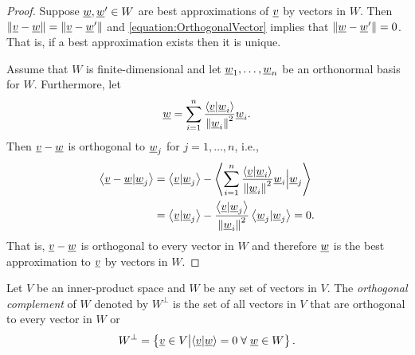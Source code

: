 \begin{proof}
Suppose $\underline{w}, \underline{w}' \in W$ are best approximations of $\underline{v}$ by vectors in $W$.
Then $\left\| \underline{v} - \underline{w} \right\| = \left\| \underline{v} - \underline{w}' \right\|$ and \eqref{equation:OrthogonalVector} implies that $\left\| \underline{w} - \underline{w}' \right\| = 0$.
That is, if a best approximation exists then it is unique.

Assume that $W$ is finite-dimensional and let $\underline{w}_1, \ldots, \underline{w}_n$ be an orthonormal basis for $W$.
Furthermore, let
\begin{equation*}
\underline{w} = \sum_{i=1}^n \frac{ \left\langle \underline{v} | \underline{w}_i \right\rangle }{ \left\| \underline{w}_i \right\|^2 } \underline{w}_i .
\end{equation*}
Then $\underline{v} -\underline{w}$ is orthogonal to $\underline{w}_j$ for $j = 1, \ldots, n$, i.e.,
\begin{equation*}
\begin{split}
\left\langle \underline{v} - \underline{w} | \underline{w}_j \right\rangle
&= \left\langle \underline{v} | \underline{w}_j \right\rangle
- \left\langle \sum_{i=1}^n \frac{ \left\langle \underline{v} | \underline{w}_i \right\rangle }{ \left\| \underline{w}_i \right\|^2 } \underline{w}_i \Big| \underline{w}_j \right\rangle \\
&= \left\langle \underline{v} | \underline{w}_j \right\rangle
- \frac{ \left\langle \underline{v} | \underline{w}_j \right\rangle }{ \left\| \underline{w}_i \right\|^2 } \left\langle \underline{w}_j | \underline{w}_j \right\rangle
= 0.
\end{split}
\end{equation*}
That is, $\underline{v} - \underline{w}$ is orthogonal to every vector in $W$ and therefore $\underline{w}$ is the best approximation to $\underline{v}$ by vectors in $W$.
\end{proof}

\begin{definition}
Let $V$ be an inner-product space and $W$ be any set of vectors in $V$.
The \emph{orthogonal complement} of $W$ denoted by $W^{\bot}$ is the set of all vectors in $V$ that are orthogonal to every vector in $W$ or
\begin{equation*}
W^{\bot} = \left\{ \underline{v} \in V \big| \langle \underline{v} | \underline{w} \rangle = 0 \; \forall \; \underline{w}\in W \right\}. 
\end{equation*}
\end{definition}

